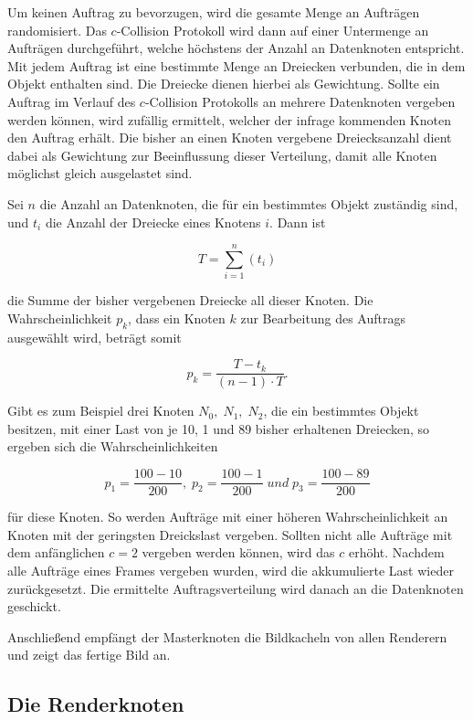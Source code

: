Um keinen Auftrag zu bevorzugen, wird die gesamte Menge an Aufträgen randomisiert. Das $c$-Collision Protokoll wird dann auf einer Untermenge an Aufträgen durchgeführt, welche höchstens der Anzahl an Datenknoten entspricht. Mit jedem Auftrag ist eine bestimmte Menge an Dreiecken verbunden, die in dem Objekt enthalten sind. Die Dreiecke dienen hierbei als Gewichtung. Sollte ein Auftrag im Verlauf des $c$-Collision Protokolls an mehrere Datenknoten vergeben werden können, wird zufällig ermittelt, welcher der infrage kommenden Knoten den Auftrag erhält. Die bisher an einen Knoten vergebene Dreiecksanzahl dient dabei als Gewichtung zur Beeinflussung dieser Verteilung, damit alle Knoten möglichst gleich ausgelastet sind.


Sei $n$ die Anzahl an Datenknoten, die für ein bestimmtes Objekt zuständig sind, und $t_i$ die Anzahl der Dreiecke eines Knotens $i$. Dann ist

\[T=\sum_{i=1}^{n} \left(t_i\right)\]

die Summe der bisher vergebenen Dreiecke all dieser Knoten. Die Wahrscheinlichkeit $p_k$, dass ein Knoten $k$ zur Bearbeitung des Auftrags ausgewählt wird, beträgt somit 

$$p_k=\frac{T-t_k}{\left(n-1\right)\cdot T}.$$

Gibt es zum Beispiel drei Knoten $N_0,\; N_1,\; N_2$, die ein bestimmtes Objekt besitzen, mit einer Last von je 10, 1 und 89 bisher erhaltenen Dreiecken, so ergeben sich die Wahrscheinlichkeiten

\[p_1=\frac{100-10}{200}, \;p_2=\frac{100-1}{200}\; und \;p_3=\frac{100-89}{200}\]

für diese Knoten. So werden Aufträge mit einer höheren Wahrscheinlichkeit an Knoten mit der geringsten Dreickslast vergeben. Sollten nicht alle Aufträge mit dem anfänglichen $c=2$ vergeben werden können, wird das $c$ erhöht. Nachdem alle Aufträge eines Frames vergeben wurden, wird die akkumulierte Last wieder zurückgesetzt. Die ermittelte Auftragsverteilung wird danach an die Datenknoten geschickt.


Anschließend empfängt der Masterknoten die Bildkacheln von allen Renderern und zeigt das fertige Bild an.

\subsection{Die Renderknoten}
\label{sec:impl:render}

